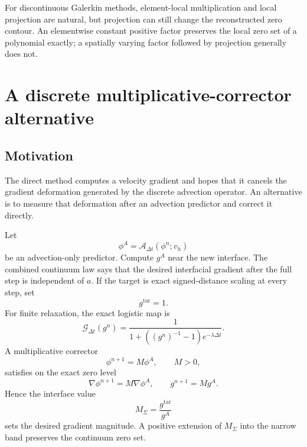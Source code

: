 \documentclass[11pt,a4paper]{article}
\theoremstyle{definition}
\theoremstyle{remark}
\begin{document}
For discontinuous Galerkin methods, element-local multiplication and local projection are natural, but projection can still change the reconstructed zero contour. An elementwise constant positive factor preserves the local zero set of a polynomial exactly; a spatially varying factor followed by projection generally does not.

\section{A discrete multiplicative-corrector alternative}

\subsection{Motivation}

The direct method computes a velocity gradient and hopes that it cancels the gradient deformation generated by the discrete advection operator. An alternative is to measure that deformation after an advection predictor and correct it directly.

Let
\begin{equation}
  \phi^A=\mathcal A_{\Delta t}(\phi^n;v_h)
\end{equation}
be an advection-only predictor. Compute $g^A$ near the new interface. The combined continuum law says that the desired interfacial gradient after the full step is independent of $a$. If the target is exact signed-distance scaling at every step, set
\begin{equation}
  g^{\mathrm{tar}}=1.
\end{equation}
For finite relaxation, the exact logistic map is
\begin{equation}
  \mathcal G_{\Delta t}(g^n)
  =\frac{1}{1+\left((g^n)^{-1}-1\right)e^{-\lambda\Delta t}}.
  \label{eq:logistic-map}
\end{equation}
A multiplicative corrector
\begin{equation}
  \phi^{n+1}=M\phi^A,
  \qquad M>0,
  \label{eq:multiplicative-corrector}
\end{equation}
satisfies on the exact zero level
\begin{equation}
  \nabla\phi^{n+1}=M\nabla\phi^A,
  \qquad
  g^{n+1}=Mg^A.
\end{equation}
Hence the interface value
\begin{equation}
  M_\Sigma=\frac{g^{\mathrm{tar}}}{g^A}
  \label{eq:M-interface}
\end{equation}
sets the desired gradient magnitude. A positive extension of $M_\Sigma$ into the narrow band preserves the continuum zero set.
\end{document}
